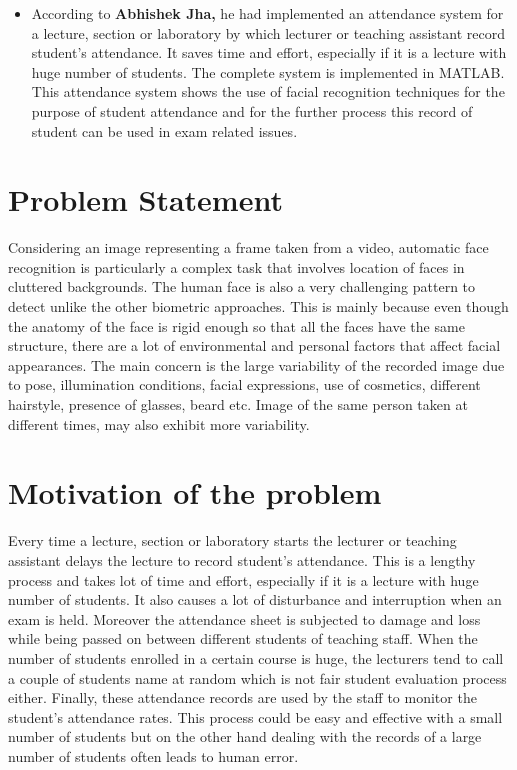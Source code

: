 \begin{itemize}
\item According to \textbf{Abhishek Jha,} he had implemented an attendance system for a lecture, section or laboratory by which lecturer or teaching assistant record student’s attendance. It saves time and effort, especially if it is a lecture with huge number of students. The complete system is implemented in MATLAB. This attendance system shows the use of facial recognition techniques for the purpose of student attendance and for the further process this record of student can be used in exam related issues.

\end{itemize}

\section{Problem Statement}
Considering an image representing a frame taken from a video, automatic face recognition is particularly a complex task that involves location of faces in cluttered backgrounds. The human face is also a very challenging pattern to detect unlike the other biometric approaches. This is mainly because even though the anatomy of the face is rigid enough so that all the faces have the same structure, there are a lot of environmental and personal factors that affect facial appearances. The main concern is the large variability of the recorded image due to pose, illumination conditions, facial expressions, use of cosmetics, different hairstyle, presence of glasses, beard etc. Image of the same person taken at different times, may also exhibit more variability.

\section{Motivation of the problem}
Every time a lecture, section or laboratory starts the lecturer or teaching assistant delays the lecture to record student’s attendance. This is a lengthy process and takes lot of time and effort, especially if it is a lecture with huge number of students. It also causes a lot of disturbance and interruption when an exam is held. Moreover the attendance sheet is subjected to damage and loss while being passed on between different students of teaching staff.
When the number of students enrolled in a certain course is huge, the lecturers tend to call a couple of students name at random which is not fair student evaluation process either. Finally, these attendance records are used by the staff to monitor the student’s attendance rates. This process could be easy and effective with a small number of students but on the other hand dealing with the records of a large number of students often leads to human error.

